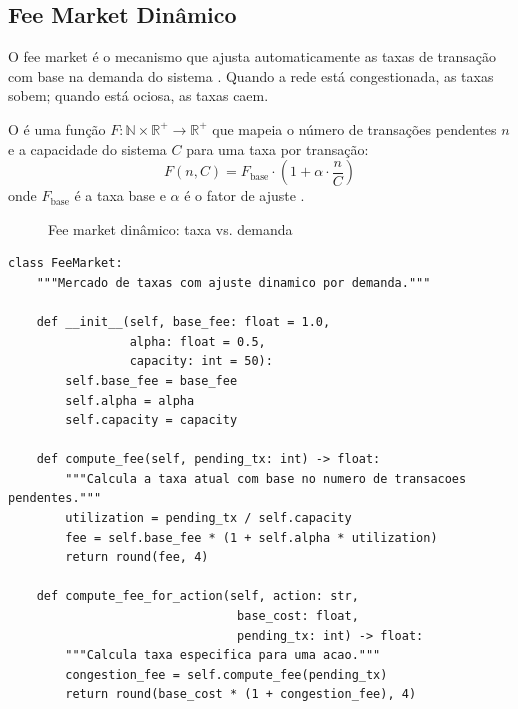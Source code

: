 \subsection{Fee Market Dinâmico}

O fee market é o mecanismo que ajusta automaticamente as taxas de
transação com base na demanda do sistema \cite{opencode2026token,
buterin2014next}. Quando a rede está congestionada, as taxas
sobem; quando está ociosa, as taxas caem.

\begin{definicao}
O  é uma função $F: \mathbb{N} \times
\mathbb{R}^+ \to \mathbb{R}^+$ que mapeia o número de transações
pendentes $n$ e a capacidade do sistema $C$ para uma taxa por
transação:
\[
F(n, C) = F_{\text{base}} \cdot \left(1 + \alpha \cdot
\frac{n}{C}\right)
\]
onde $F_{\text{base}}$ é a taxa base e $\alpha$ é o fator de
ajuste \cite{opencode2026token}.
\end{definicao}

\begin{figure}[htb]
\centering
\caption{Fee market dinâmico: taxa vs. demanda}
\label{fig:fee-market}
\end{figure}

\begin{lstlisting}[caption={Fee market dinamico implementado},label={lst:fee-market}]
class FeeMarket:
    """Mercado de taxas com ajuste dinamico por demanda."""

    def __init__(self, base_fee: float = 1.0,
                 alpha: float = 0.5,
                 capacity: int = 50):
        self.base_fee = base_fee
        self.alpha = alpha
        self.capacity = capacity

    def compute_fee(self, pending_tx: int) -> float:
        """Calcula a taxa atual com base no numero de transacoes pendentes."""
        utilization = pending_tx / self.capacity
        fee = self.base_fee * (1 + self.alpha * utilization)
        return round(fee, 4)

    def compute_fee_for_action(self, action: str,
                                base_cost: float,
                                pending_tx: int) -> float:
        """Calcula taxa especifica para uma acao."""
        congestion_fee = self.compute_fee(pending_tx)
        return round(base_cost * (1 + congestion_fee), 4)
\end{lstlisting}

